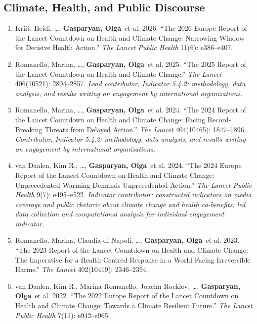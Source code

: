 \documentclass[10pt]{article}
\newcommand{\me}{\textbf{Gasparyan, Olga}}
\newcommand{\note}[1]{\emph{#1}}
\begin{document}
\subsection{Climate, Health, and Public Discourse}
\begin{enumerate}[resume]
    \item Kriit, Heidi, \ldots, \me\ et al. 2026. ``The 2026 Europe Report of the Lancet Countdown on Health and Climate Change: Narrowing Window for Decisive Health Action.'' \textit{The Lancet Public Health} 11(6): e386--e407.

    \item Romanello, Marina, \ldots, \me\ et al. 2025. ``The 2025 Report of the Lancet Countdown on Health and Climate Change.'' \textit{The Lancet} 406(10521): 2804--2857. \note{Lead contributor, Indicator 5.4.2: methodology, data analysis, and results writing on engagement by international organizations.}

    \item Romanello, Marina, \ldots, \me\ et al. 2024. ``The 2024 Report of the Lancet Countdown on Health and Climate Change: Facing Record-Breaking Threats from Delayed Action.'' \textit{The Lancet} 404(10465): 1847--1896. \note{Contributor, Indicator 5.4.2: methodology, data analysis, and results writing on engagement by international organizations.}

    \item van Daalen, Kim R., \ldots, \me\ et al. 2024. ``The 2024 Europe Report of the Lancet Countdown on Health and Climate Change: Unprecedented Warming Demands Unprecedented Action.'' \textit{The Lancet Public Health} 9(7): e495--e522. \note{Indicator contributor: constructed indicators on media coverage and public rhetoric about climate change and health co-benefits; led data collection and computational analysis for individual engagement indicator.}

    \item Romanello, Marina, Claudia di Napoli, \ldots, \me\ et al. 2023. ``The 2023 Report of the Lancet Countdown on Health and Climate Change: The Imperative for a Health-Centred Response in a World Facing Irreversible Harms.'' \textit{The Lancet} 402(10419): 2346--2394.

    \item van Daalen, Kim R., Marina Romanello, Joacim Rocklov, \ldots, \me\ et al. 2022. ``The 2022 Europe Report of the Lancet Countdown on Health and Climate Change: Towards a Climate Resilient Future.'' \textit{The Lancet Public Health} 7(11): e942--e965.
\end{enumerate}
\end{document}
